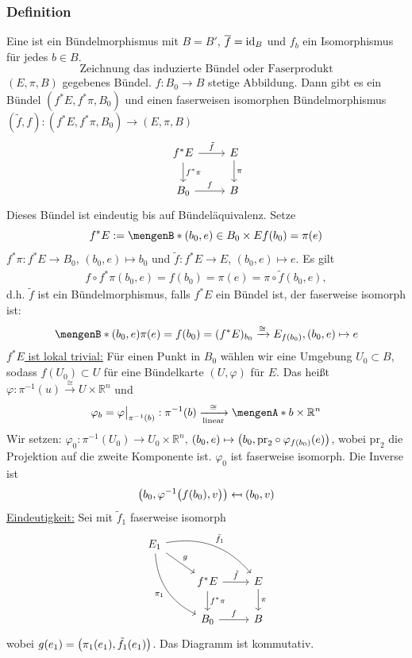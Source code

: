 \subsubsection[Definition: Bündeläquivalenz]{Definition} %
\label{ssub:433}
Eine  ist ein Bündelmorphismus mit $B = B'$, $\overline{f} = \id_B$ und $f_b$ ein Isomorphismus für jedes $b \in B$.
\[
	\text{Zeichnung das induzierte Bündel oder Faserprodukt}
\]
$(E, \pi , B)$ gegebenes Bündel. $f : B_0 \to B$ stetige Abbildung. Dann gibt es ein Bündel $(f^*E, f^*\pi, B_0)$ und einen faserweisen isomorphen Bündelmorphismus
$(\tilde{f},f) : (f^*E, f^*\pi, B_0) \to (E,\pi , B)$
\[
	\begin{tikzcd}
		 f^*E \dar{f^*\pi } \rar{\tilde{f}} & E \dar{\pi} \\
		 B_0 \rar{f}& B
	\end{tikzcd}
\]
Dieses Bündel ist eindeutig bis auf Bündeläquivalenz.
Setze
\[
	f^*E := \set[(b_0,e) \in B_0 \times E]{f(b_0) = \pi(e)} 
\]
$f^* \pi : f^*E \to B_0$, $(b_0,e) \mapsto b_0$ und $\tilde{f} : f^*E \to E$, $(b_0,e) \mapsto e$. Es gilt
\begin{align*}
	f \circ f^* \pi (b_0,e) = f(b_0) = \pi(e) = \pi \circ \tilde{f}(b_0,e),
\end{align*}
d.h. $\tilde{f}$ ist ein Bündelmorphismus, falls $f^*E$ ein Bündel ist, der faserweise isomorph ist: 
\[
	\set[(b_0,e)]{\pi(e)= f(b_0)} = (f^*E)_{b_0} \xrightarrow{\cong} E_{f(b_0)}, (b_0,e) \mapsto e 
\]
\uline{$f^*E$ ist lokal trivial:} Für einen Punkt in $B_0$ wählen wir eine Umgebung $U_0 \subset B$, sodass $f(U_0) \subset U$ für eine Bündelkarte $(U,\varphi)$ für $E$.
Das heißt $\varphi : \pi  ^{-1}(u) \xrightarrow{\cong} U \times \mathds{R}^n $ und
\[
	\varphi_b = \varphi\big|_{\pi ^{-1}(b)} : \pi  ^{-1}(b) \xrightarrow[\text{linear}]{\cong} \set{b} \times \mathds{R}^n 
\]
Wir setzen: $\varphi_0 : \pi  ^{-1} (U_0) \to U_0 \times \mathds{R}^n$, $(b_0,e) \mapsto \enbrace[\big]{b_0, \mathrm{pr}_2 \circ \varphi_{f(b_0)}(e)}$, wobei $\mathrm{pr}_2$ die Projektion auf die zweite Komponente ist. $\varphi_0$ ist faserweise isomorph. Die Inverse ist
\[
	\enbrace*{b_0, \varphi ^{-1} \enbrace[\big]{f(b_0), v} } \mapsfrom (b_0, v)
\]
\uline{Eindeutigkeit:} Sei mit $\tilde{f}_1$ faserweise isomorph
\[
	\begin{tikzcd}
		E_1 \drar{g} \arrow[ddr, swap, "\pi_1", bend right] \arrow[drr, "\tilde{f}_1", bend left]& & \\
		 & f^*E \rar{\tilde{f}} \dar{f^*\pi} & E \dar{\pi } \\
		& B_0 \rar{f} & B
	\end{tikzcd}
\]
wobei $g(e_1) = \enbrace*{\pi_1(e_1), \tilde{f}_1(e_1)} $. Das Diagramm ist kommutativ.

